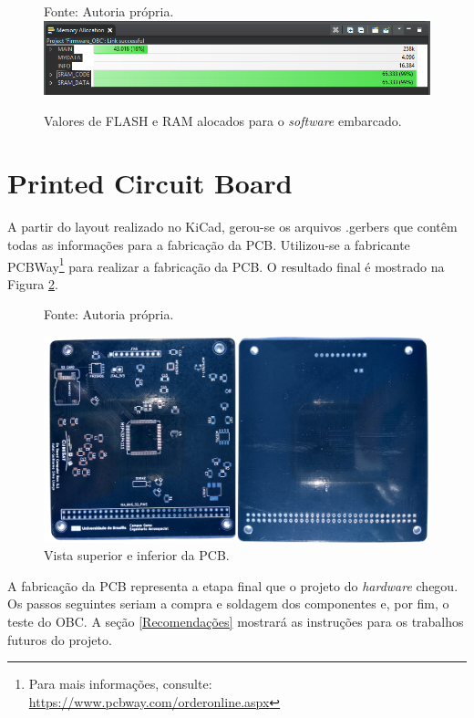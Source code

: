 \begin{figure}[h]
\footnotesize{	
	\centering
			\centering
	\footnotesize{Fonte: Autoria própria.}
	\includegraphics[keepaspectratio=true,scale=0.64]{figuras/memoryAllocation_Full.PNG}
	\caption{Valores de FLASH e RAM alocados para o \textit{software} embarcado.}	
	\label{memoryAllocation_Full}
}
\end{figure}
\FloatBarrier

\newpage
\section{Printed Circuit Board}

A partir do layout realizado no KiCad, gerou-se os arquivos .gerbers que contêm todas as informações para a fabricação da PCB. Utilizou-se a fabricante PCBWay\footnote{Para mais informações, consulte: \url{https://www.pcbway.com/orderonline.aspx}} para realizar a fabricação da PCB. O resultado final é mostrado na Figura \ref{pcb_bothSides}.


\begin{figure}[h]
\footnotesize{	
	\centering
			\centering
	\footnotesize{Fonte: Autoria própria.}
	
	\includegraphics[keepaspectratio=true,scale=0.7]{figuras/pcb_bothSides.png}
	\caption{Vista superior e inferior da PCB.}
	\label{pcb_bothSides}
}
\end{figure}
\FloatBarrier

A fabricação da PCB representa a etapa final que o projeto do \textit{hardware} chegou. Os passos seguintes seriam a compra e soldagem dos componentes e, por fim, o teste do OBC. A seção \ref{Recomendações} mostrará as instruções para os trabalhos futuros do projeto.

